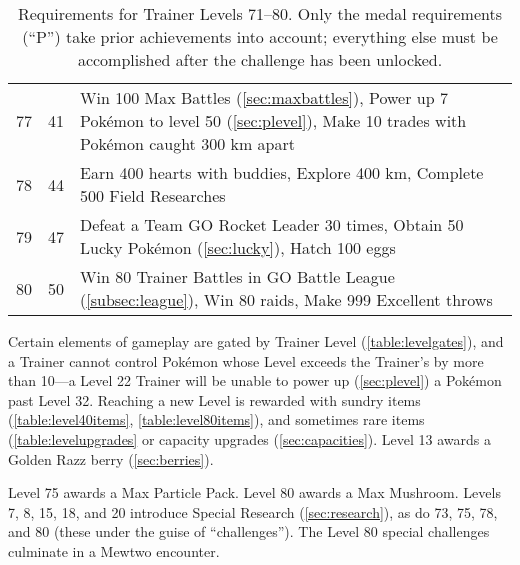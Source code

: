 \begin{table}
\begin{tabular}{rrp{}}
  77 & 41 & Win 100 Max Battles (\autoref{sec:maxbattles}),\newline
  Power up 7 Pokémon to level 50 (\autoref{sec:plevel}),\newline
  Make 10 trades with Pokémon caught 300 km apart\\
\rowcolor{Gray!25}
  78 & 44 & Earn 400 hearts with buddies,\newline
  Explore 400 km,\newline
  Complete 500 Field Researches\\
  79 & 47 & Defeat a Team GO Rocket Leader 30 times,\newline
  Obtain 50 Lucky Pokémon (\autoref{sec:lucky}),\newline
  Hatch 100 eggs\\
\rowcolor{Gray!25}
  80 & 50 & Win 80 Trainer Battles in GO Battle League (\autoref{subsec:league}),\newline
  Win 80 raids,\newline
  Make 999 Excellent throws\\
\end{tabular}
\caption[Requirements for Trainer Levels 71--80]{Requirements for Trainer Levels 71--80.
   Only the medal requirements (``P'') take prior achievements into account; everything else
   must be accomplished after the challenge has been unlocked.\label{table:xp71plus}}
\end{table}
Certain elements of gameplay are gated by Trainer Level (\autoref{table:levelgates}),
  and a Trainer cannot control Pokémon whose Level exceeds the Trainer's
  by more than 10---a Level 22 Trainer will be unable to power up (\autoref{sec:plevel}) a Pokémon past Level 32.
Reaching a new Level is rewarded with sundry items (\autoref{table:level40items}, \autoref{table:level80items}),
 and sometimes rare items (\autoref{table:levelupgrades} or capacity upgrades (\autoref{sec:capacities}).
Level 13 awards a Golden Razz berry (\autoref{sec:berries}).

Level 75 awards a Max Particle Pack.
Level 80 awards a Max Mushroom.
Levels 7, 8, 15, 18, and 20 introduce Special Research (\autoref{sec:research}), as do
 73, 75, 78, and 80 (these under the guise of ``challenges'').
The Level 80 special challenges culminate in a Mewtwo encounter.
